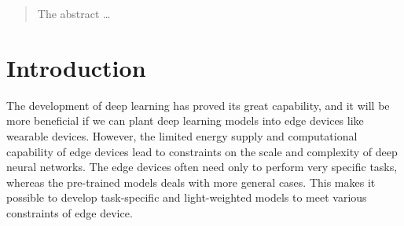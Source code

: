 \documentclass[sigplan,10pt,review]{acmart}\settopmatter{printfolios=true,printccs=false,printacmref=false}
\begin{document}
\begin{abstract}
  The abstract \dots
\end{abstract}





\keywords{}  %


\maketitle

\section{Introduction}
\label{sec:intro}
The development of deep learning has proved its great capability, and it will be more beneficial if we can plant deep learning models into edge devices like wearable devices.
However, the limited energy supply and computational capability of edge devices lead to constraints on the scale and complexity of deep neural networks.
The edge devices often need only to perform very specific tasks, whereas the pre-trained models deals with more general cases.
This makes it possible to develop task-specific and light-weighted models to meet various constraints of edge device.

\end{document}
